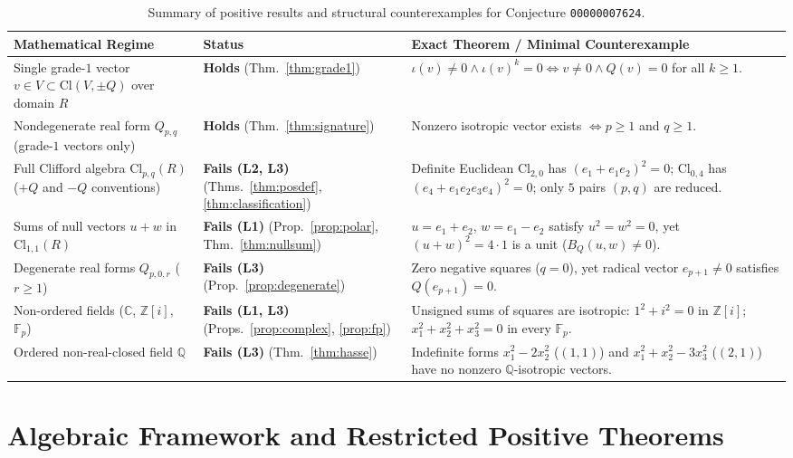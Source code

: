 \documentclass[11pt]{article}
\theoremstyle{definition}
\newcommand{\Cl}{\mathrm{Cl}}
\newcommand{\F}{\mathbb{F}}
\newcommand{\Q}{\mathbb{Q}}
\newcommand{\Z}{\mathbb{Z}}
\newcommand{\C}{\mathbb{C}}
\begin{document}
\begin{table}[ht]
\centering
\small
\renewcommand{\arraystretch}{1.16}
\begin{tabular}{@{}>{\raggedright\arraybackslash}p{}>{\raggedright\arraybackslash}p{}>{\raggedright\arraybackslash}p{}@{}}
\toprule
\textbf{Mathematical Regime} & \textbf{Status} & \textbf{Exact Theorem / Minimal Counterexample} \\
\midrule
Single grade-$1$ vector $v \in V \subset \Cl(V, \pm Q)$ over domain $R$ &
\textbf{Holds} (Thm.~\ref{thm:grade1}) &
$\iota(v) \ne 0 \land \iota(v)^k = 0 \iff v \ne 0 \land Q(v) = 0$ for all $k \ge 1$. \\
Nondegenerate real form $Q_{p,q}$ (grade-$1$ vectors only) &
\textbf{Holds} (Thm.~\ref{thm:signature}) &
Nonzero isotropic vector exists $\iff p \ge 1$ and $q \ge 1$. \\
Full Clifford algebra $\Cl_{p,q}(R)$ ($+Q$ and $-Q$ conventions) &
\textbf{Fails (L2, L3)} (Thms.~\ref{thm:posdef}, \ref{thm:classification}) &
Definite Euclidean $\Cl_{2,0}$ has $(e_1 + e_1 e_2)^2 = 0$; $\Cl_{0,4}$ has $(e_4 + e_1 e_2 e_3 e_4)^2 = 0$; only $5$ pairs $(p,q)$ are reduced. \\
Sums of null vectors $u + w$ in $\Cl_{1,1}(R)$ &
\textbf{Fails (L1)} (Prop.~\ref{prop:polar}, Thm.~\ref{thm:nullsum}) &
$u = e_1 + e_2$, $w = e_1 - e_2$ satisfy $u^2 = w^2 = 0$, yet $(u+w)^2 = 4 \cdot 1$ is a unit ($B_Q(u,w) \ne 0$). \\
Degenerate real forms $Q_{p,0,r}$ ($r \ge 1$) &
\textbf{Fails (L3)} (Prop.~\ref{prop:degenerate}) &
Zero negative squares ($q = 0$), yet radical vector $e_{p+1} \ne 0$ satisfies $Q(e_{p+1}) = 0$. \\
Non-ordered fields ($\C$, $\Z[i]$, $\F_p$) &
\textbf{Fails (L1, L3)} (Props.~\ref{prop:complex}, \ref{prop:fp}) &
Unsigned sums of squares are isotropic: $1^2 + i^2 = 0$ in $\Z[i]$; $x_1^2 + x_2^2 + x_3^2 = 0$ in every $\F_p$. \\
Ordered non-real-closed field $\Q$ &
\textbf{Fails (L3)} (Thm.~\ref{thm:hasse}) &
Indefinite forms $x_1^2 - 2x_2^2$ ($(1,1)$) and $x_1^2 + x_2^2 - 3x_3^2$ ($(2,1)$) have no nonzero $\Q$-isotropic vectors. \\
\bottomrule
\end{tabular}
\caption{Summary of positive results and structural counterexamples for Conjecture \texttt{00000007624}.}
\label{tab:summary}
\end{table}

\section{Algebraic Framework and Restricted Positive Theorems}
\end{document}
